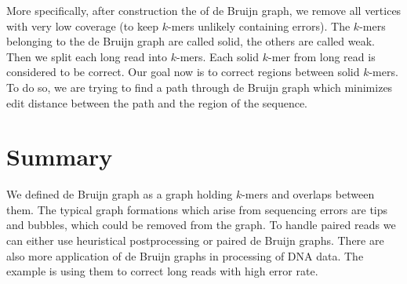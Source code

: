 More specifically, after construction the of de Bruijn graph, we remove all vertices
with very low coverage (to keep $k$-mers unlikely containing errors). The $k$-mers belonging
to the de Bruijn graph are called solid, the others are called weak.
Then we split each long read into $k$-mers.
Each solid $k$-mer from long read is considered to be correct. 
Our goal now is to correct regions between solid $k$-mers. To do so, we are trying
to find a path through de Bruijn graph which minimizes edit distance between the path
and the region of the sequence.

\section{Summary}

We defined de Bruijn graph as a graph holding $k$-mers and overlaps between
them. The typical graph formations which arise from sequencing errors are
tips and bubbles, which could be removed from the graph. To handle paired reads
we can either use heuristical postprocessing or paired de Bruijn graphs. 
There are also more application of de Bruijn graphs in processing of DNA data.
The example is using them to correct long reads with high error rate.
